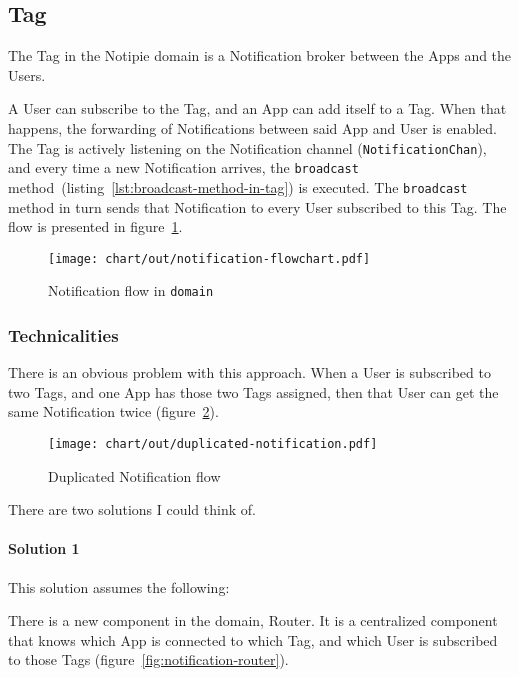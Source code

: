 \subsection{Tag}\label{sec:tag}

The Tag in the Notipie domain
is a Notification broker
between the Apps and the Users.

A User can subscribe to the Tag,
and an App can add itself to a Tag.
When that happens,
the forwarding of Notifications
between said App and User is enabled.
The Tag is actively listening
on the Notification channel (\texttt{NotificationChan}),
and every time a new Notification arrives,
the \texttt{broadcast} method~(listing~\ref{lst:broadcast-method-in-tag})
is executed.
The \texttt{broadcast} method in turn sends that Notification
to every User subscribed to this Tag.
The flow is presented in figure~\ref{fig:notification-flowchart}.

\begin{figure}[h]
  \centering
  \texttt{[image: chart/out/notification-flowchart.pdf]}
  \caption{Notification flow in \texttt{domain}}
  \label{fig:notification-flowchart}
\end{figure}

\subsubsection{Technicalities}\label{sec:tag-technicalities}

There is an obvious problem with this approach.
When a User is subscribed to two Tags,
and one App has those two Tags assigned,
then that User can get the same Notification twice
(figure~\ref{fig:duplicated-notification}).

\begin{figure}[h]
  \centering
  \texttt{[image: chart/out/duplicated-notification.pdf]}
  \caption{Duplicated Notification flow}
  \label{fig:duplicated-notification}
\end{figure}

There are two solutions I could think of.

\paragraph*{Solution 1}\label{par:duplication-solution-1}

This solution assumes the following:

There is a new component in the domain, Router.
It is a centralized component
that knows which App is connected to which Tag,
and which User is subscribed to those Tags
(figure~\ref{fig:notification-router}).

